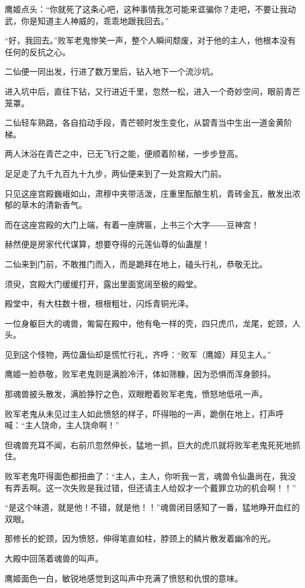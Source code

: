 \begin{this_body}
鹰姬点头：“你就死了这条心吧，这种事情我怎可能来诓骗你？走吧，不要让我动武，你是知道主人神威的，乖乖地跟我回去。”

“好，我回去。”败军老鬼惨笑一声，整个人瞬间颓废，对于他的主人，他根本没有任何的反抗之心。

二仙便一同出发，行进了数万里后，钻入地下一个流沙坑。

进入坑中后，直往下钻，又行进近千里，忽然一松，进入一个奇妙空间，眼前青芒笼罩。

二仙轻车熟路，各自掐动手段，青芒顿时发生变化，从碧青当中生出一道金黄阶梯。

两人沐浴在青芒之中，已无飞行之能，便顺着阶梯，一步步登高。

足足走了九千九百九十九步，两仙便来到了一处宫殿大门前。

只见这座宫殿巍峨如山，肃穆中夹带活泼，庄重里酝酿生机，青砖金瓦，散发出浓郁的草木的清新香气。

而在这座宫殿的大门上端，有着一座牌匾，上书三个大字――豆神宫！

赫然便是房家代代谋算，想要夺得的元莲仙尊的仙蛊屋！

二仙来到门前，不敢推门而入，而是跪拜在地上，磕头行礼，恭敬无比。

须臾，宫殿大门缓缓打开，露出里面宽阔至极的殿堂。

殿堂中，有大柱数十根，根根粗壮，闪烁青铜光泽。

一位身躯巨大的魂兽，匍匐在殿中，他有龟一样的壳，四只虎爪，龙尾，蛇颈，人头。

见到这个怪物，两位蛊仙却是慌忙行礼，齐呼：“败军（鹰姬）拜见主人。”

鹰姬一脸恭敬，败军老鬼则是满脸冷汗，体如筛糠，因为恐惧而浑身颤抖。

那魂兽披头散发，满脸狰狞之色，双眼瞪着败军老鬼，愤怒地低吼一声。

败军老鬼从未见过主人如此愤怒的样子，吓得啪的一声，跪倒在地上，打声呼喊：“主人饶命，主人饶命啊！”

但魂兽充耳不闻，右前爪忽然伸长，猛地一抓，巨大的虎爪就将败军老鬼死死地抓住。

败军老鬼吓得面色都扭曲了：“主人，主人，你听我一言，魂兽令仙蛊尚在，我没有弄丢啊。这一次失败是我过错，但还请主人给奴才一个戴罪立功的机会啊！！”

“是这个味道，就是他！不错，就是他！！”魂兽闭目感知了一番，猛地睁开血红的双眼。

那修长的蛇颈，因为愤怒，伸得笔直如柱，脖颈上的鳞片散发着幽冷的光。

大殿中回荡着魂兽的叫声。

鹰姬面色一白，敏锐地感觉到这叫声中充满了愤怒和仇恨的意味。


\end{this_body}

